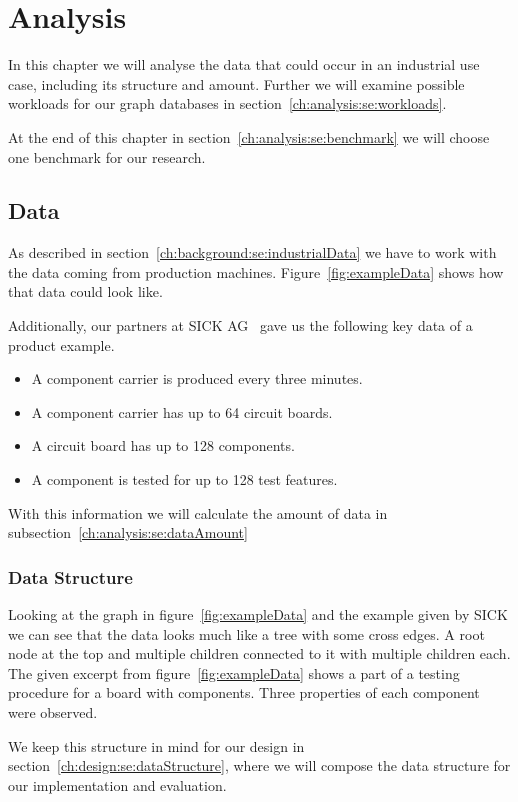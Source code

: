 \chapter{Analysis}
\label{ch:analysis}
In this chapter we will analyse the data that could occur in an industrial use case,
including its structure and amount.
Further we will examine possible workloads for our graph databases in section~\ref{ch:analysis:se:workloads}.

At the end of this chapter in section~\ref{ch:analysis:se:benchmark} we will choose one benchmark for our research.

\section{Data}
\label{ch:analysis:se:data}
As described in section~\ref{ch:background:se:industrialData} we have to work with the data coming from production machines.
Figure~\ref{fig:exampleData} shows how that data could look like.

Additionally,
our partners at SICK AG~\cite{SICK} gave us the following key data of a product example.

\begin{itemize}
  \item A component carrier is produced every three minutes.
  \item A component carrier has up to 64 circuit boards.
  \item A circuit board has up to 128 components.
  \item A component is tested for up to 128 test features.
\end{itemize}

With this information we will calculate the amount of data in subsection~\ref{ch:analysis:se:dataAmount}

\subsection{Data Structure}
Looking at the graph in figure~\ref{fig:exampleData} and the example given by SICK we can see that the data looks much like a tree with some cross edges.
A root node at the top and multiple children connected to it with multiple children each.
The given excerpt from figure~\ref{fig:exampleData} shows a part of a testing procedure for a board with components.
Three properties of each component were observed.

We keep this structure in mind for our design in section~\ref{ch:design:se:dataStructure},
where we will compose the data structure for our implementation and evaluation.


